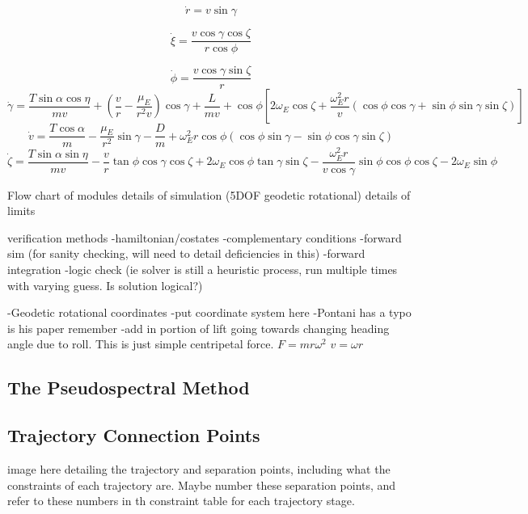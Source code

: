\begin{equation}
\dot{r} = v \sin \gamma
\end{equation}

\begin{equation}
\dot{\xi} = \frac{v\cos \gamma \cos \zeta}{r \cos \phi}
\end{equation}

\begin{equation}
\dot{\phi} = \frac{v\cos\gamma\sin\zeta}{r}
\end{equation}
\begin{equation}
\dot{\gamma} = \frac{T\sin\alpha \cos\eta}{mv} + (\frac{v}{r}-\frac{\mu_E}{r^2 v})\cos\gamma + \frac{L}{mv}
+ \cos\phi[2\omega_E \cos\zeta + \frac{\omega_E^2 r}{v}(\cos\phi\cos\gamma+\sin\phi\sin\gamma\sin\zeta)]
\end{equation}
\begin{equation}
\dot{v} = \frac{T\cos\alpha}{m}-\frac{\mu_E}{r^2}\sin\gamma - \frac{D}{m}
+ \omega_E^2 r\cos\phi(\cos\phi\sin\gamma-\sin\phi\cos\gamma\sin\zeta)
\end{equation}
\begin{equation}
\dot{\zeta} = \frac{T\sin\alpha \sin\eta}{mv}-\frac{v}{r}\tan\phi\cos\gamma\cos\zeta +2\omega_E\cos\phi\tan\gamma\sin\zeta - \frac{\omega_E^2 r}{v\cos\gamma}\sin\phi\cos\phi\cos\zeta-2\omega_E\sin\phi 
\end{equation}



	Flow chart of modules
	details of simulation (5DOF geodetic rotational)
	details of limits
	
	verification methods
	-hamiltonian/costates
	-complementary conditions
	-forward sim (for sanity checking, will need to detail deficiencies in this)
	-forward integration
	-logic check (ie solver is still a heuristic process, run multiple times with varying guess. Is solution logical?)

-Geodetic rotational coordinates 
-put coordinate system here
-Pontani has a typo is his paper remember
-add in portion of lift going towards changing heading angle due to roll. This is just simple centripetal force. 
$F=mr\omega^2$ $v=\omega r$



\subsection{The Pseudospectral Method}

\subsection{Trajectory Connection Points}
image here detailing the trajectory and separation points, including what the constraints of each trajectory are. Maybe number these separation points, and refer to these numbers in th constraint table for each trajectory stage. 



